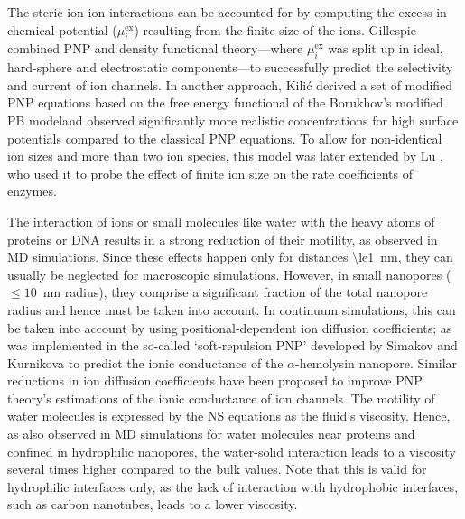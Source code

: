 \documentclass[journal=ancac3,manuscript=article,etalmode=truncate,maxauthors=0,layout=onecolumn]{achemso}
\begin{document}
The steric ion-ion interactions can be accounted for by computing the excess in chemical potential
($\mu_{i}^\text{ex}$) resulting from the finite size of the ions.\cite{Eisenberg-1996,Bazant-2009,
Daiguji-2010} Gillespie \etal{} combined PNP and density functional theory---where $\mu_{i}^\text{ex}$ was
split up in ideal, hard-sphere and electrostatic components---to successfully predict the selectivity and
current of ion channels.\cite{Gillespie-2002} In another approach, Kili\'{c} \etal{} derived a set of modified
PNP equations based on the free energy functional of the Borukhov's modified PB model\cite{Borukhov-1997}and
observed significantly more realistic concentrations for high surface potentials compared to the classical PNP
equations.\cite{Kilic-2007} To allow for non-identical ion sizes and more than two ion species, this model was
later extended by Lu \etal{}, who used it to probe the effect of finite ion size on the rate coefficients of
enzymes.\cite{Lu-2011}

The interaction of ions or small molecules like water with the heavy atoms of proteins or DNA results in a
strong reduction of their motility, as observed in MD simulations.\cite{Makarov-1998,Pronk-2014} Since these
effects happen only for distances \SI{\le1}{\nm}, they can usually be neglected for macroscopic simulations.
However, in small nanopores ($\le10$~nm radius), they comprise a significant fraction of the total nanopore
radius and hence must be taken into account.\cite{Noskov-2004,Simakov-2010,Pederson-2015,McMullen-2017} In
continuum simulations, this can be taken into account by using positional-dependent ion diffusion
coefficients; as was implemented in the so-called `soft-repulsion PNP' developed by Simakov and
Kurnikova\cite{Simakov-2010, Simakov-2018} to predict the ionic conductance of the $\alpha$-hemolysin
nanopore. Similar reductions in ion diffusion coefficients have been proposed to improve PNP theory's
estimations of the ionic conductance of ion channels.\cite{Furini-2006,Liu-2015} The motility of water
molecules is expressed by the NS equations as the fluid's viscosity. Hence, as also observed in MD simulations
for water molecules near proteins\cite{Pronk-2014} and confined in hydrophilic
nanopores,\cite{Qiao-Aluru-2003,Vo-2016,Hsu-2017} the water-solid interaction leads to a viscosity several
times higher compared to the bulk values. Note that this is valid for hydrophilic interfaces only, as the lack
of interaction with hydrophobic interfaces, such as carbon nanotubes, leads to a lower
viscosity.\cite{Ye-2011}
\end{document}
